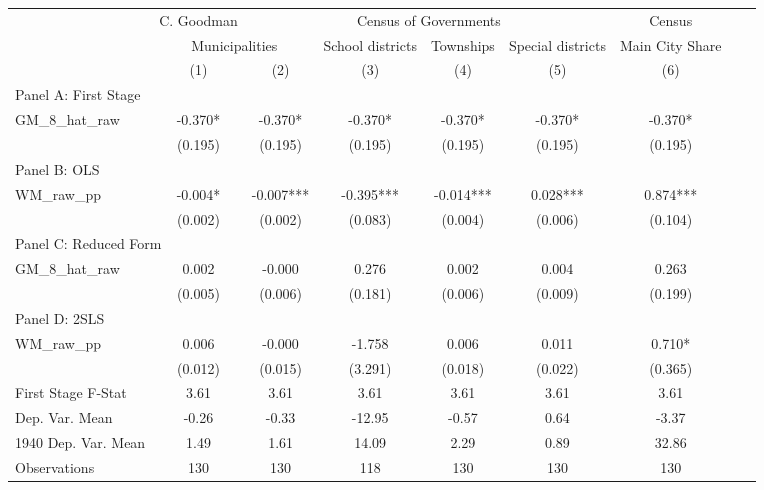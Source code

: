  \begin{tabular}{l*{8}{c}} \toprule
&\multicolumn{1}{c}{C. Goodman}&\multicolumn{4}{c}{Census of Governments}&\multicolumn{1}{c}{Census}\\\cmidrule(lr){2-2}\cmidrule(lr){3-6}\cmidrule(lr){7-7}
&\multicolumn{2}{c}{Municipalities}&\multicolumn{1}{c}{School districts}&\multicolumn{1}{c}{Townships}&\multicolumn{1}{c}{Special districts}&\multicolumn{1}{c}{Main City Share}\\\cmidrule(lr){2-3}\cmidrule(lr){4-6}\cmidrule(lr){7-7}
&\multicolumn{1}{c}{(1)}&\multicolumn{1}{c}{(2)}&\multicolumn{1}{c}{(3)}&\multicolumn{1}{c}{(4)}&\multicolumn{1}{c}{(5)}&\multicolumn{1}{c}{(6)}\\
\cmidrule(lr){1-7}
\multicolumn{6}{l}{Panel A: First Stage}\\
\cmidrule(lr){1-7}
GM\_8\_hat\_raw    &   -0.370*  &   -0.370*  &   -0.370*  &   -0.370*  &   -0.370*  &   -0.370*  \\
                &  (0.195)   &  (0.195)   &  (0.195)   &  (0.195)   &  (0.195)   &  (0.195)   \\
\cmidrule(lr){1-7}
\multicolumn{6}{l}{Panel B: OLS}\\
\cmidrule(lr){1-7}
WM\_raw\_pp       &   -0.004*  &   -0.007***&   -0.395***&   -0.014***&    0.028***&    0.874***\\
                &  (0.002)   &  (0.002)   &  (0.083)   &  (0.004)   &  (0.006)   &  (0.104)   \\
\cmidrule(lr){1-7}
\multicolumn{6}{l}{Panel C: Reduced Form}\\
\cmidrule(lr){1-7}
GM\_8\_hat\_raw    &    0.002   &   -0.000   &    0.276   &    0.002   &    0.004   &    0.263   \\
                &  (0.005)   &  (0.006)   &  (0.181)   &  (0.006)   &  (0.009)   &  (0.199)   \\
\cmidrule(lr){1-7}
\multicolumn{6}{l}{Panel D: 2SLS}\\
\cmidrule(lr){1-7}
WM\_raw\_pp       &    0.006   &   -0.000   &   -1.758   &    0.006   &    0.011   &    0.710*  \\
                &  (0.012)   &  (0.015)   &  (3.291)   &  (0.018)   &  (0.022)   &  (0.365)   \\
\midrule
First Stage F-Stat&     3.61   &     3.61   &     3.61   &     3.61   &     3.61   &     3.61   \\
Dep. Var. Mean  &    -0.26   &    -0.33   &   -12.95   &    -0.57   &     0.64   &    -3.37   \\
1940 Dep. Var. Mean&     1.49   &     1.61   &    14.09   &     2.29   &     0.89   &    32.86   \\
Observations    &      130   &      130   &      118   &      130   &      130   &      130   \\
 \bottomrule \end{tabular}
